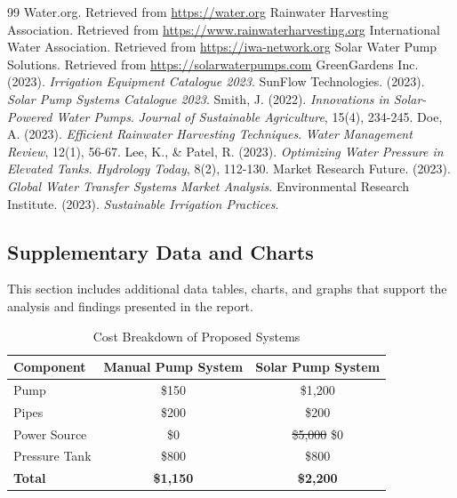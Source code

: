 \documentclass[12pt]{article}
\begin{document}
    \begin{thebibliography}{99}
         Water.org. Retrieved from \url{https://water.org}
         Rainwater Harvesting Association. Retrieved from \url{https://www.rainwaterharvesting.org}
         International Water Association. Retrieved from \url{https://iwa-network.org}
         Solar Water Pump Solutions. Retrieved from \url{https://solarwaterpumps.com}
         GreenGardens Inc. (2023). \textit{Irrigation Equipment Catalogue 2023}.
         SunFlow Technologies. (2023). \textit{Solar Pump Systems Catalogue 2023}.
         Smith, J. (2022). \textit{Innovations in Solar-Powered Water Pumps}. \textit{Journal of Sustainable Agriculture}, 15(4), 234-245.
         Doe, A. (2023). \textit{Efficient Rainwater Harvesting Techniques}. \textit{Water Management Review}, 12(1), 56-67.
         Lee, K., \& Patel, R. (2023). \textit{Optimizing Water Pressure in Elevated Tanks}. \textit{Hydrology Today}, 8(2), 112-130.
         Market Research Future. (2023). \textit{Global Water Transfer Systems Market Analysis}.
         Environmental Research Institute. (2023). \textit{Sustainable Irrigation Practices}.
    \end{thebibliography}
    
    \subsection{Supplementary Data and Charts}
    This section includes additional data tables, charts, and graphs that support the analysis and findings presented in the report.
    \begin{table}[h!]
        \centering
        \caption{Cost Breakdown of Proposed Systems}
        \begin{tabular}{|l|c|c|}
            \hline
            \textbf{Component} & \textbf{Manual Pump System} & \textbf{Solar Pump System} \\ \hline
            Pump & \$150 & \$1,200 \\ \hline
            Pipes & \$200 & \$200 \\ \hline
            Power Source & \$0 & \sout{\$5,000} \$0 \\ \hline
            Pressure Tank & \$800 & \$800 \\ \hline
            \textbf{Total} & \textbf{\$1,150} & \textbf{\$2,200} \\ \hline
        \end{tabular}
        \label{tab:cost_breakdown}
    \end{table}
    
\end{document}
